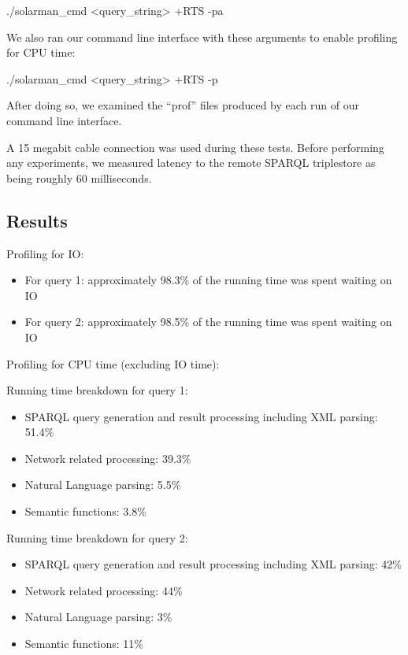 \documentclass[../main.tex]{subfiles}
\begin{document}
\begin{code}
	./solarman_cmd <query_string> +RTS -pa
\end{code}

We also ran our command line interface with these arguments to enable profiling for CPU time:

\begin{code}
./solarman_cmd <query_string> +RTS -p
\end{code}

After doing so, we examined the ``prof'' files produced by each run of our command line interface.

A 15 megabit cable connection was used during these tests.  Before performing any experiments,
we measured latency to the remote SPARQL triplestore as being roughly 60 milliseconds.

\subsection{Results}

Profiling for IO:

\begin{itemize}
	\item For query 1: approximately 98.3\% of the running time was spent waiting on IO
	\item For query 2: approximately 98.5\% of the running time was spent waiting on IO
\end{itemize}

\noindent Profiling for CPU time (excluding IO time):

\noindent Running time breakdown for query 1:

\begin{itemize}
	\item SPARQL query generation and result processing including XML parsing: 51.4\%
	\item Network related processing: 39.3\%
	\item Natural Language parsing: 5.5\%
	\item Semantic functions: 3.8\%
\end{itemize}

\noindent Running time breakdown for query 2:

\begin{itemize}
	\item SPARQL query generation and result processing including XML parsing: 42\%
	\item Network related processing: 44\%
	\item Natural Language parsing: 3\%
	\item Semantic functions: 11\%
\end{itemize}
\end{document}
